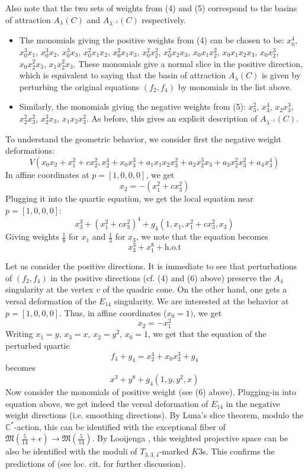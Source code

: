 \documentclass[11pt]{amsart}
\numberwithin{equation}{section}
\theoremstyle{plain}
\theoremstyle{remark}
\theoremstyle{definition}
\newcommand{\bC}{\mathbb{C}}
\newcommand{\gM}{\mathfrak{M}}
\begin{document}
Also note that the two sets of weights from (4) and (5) correspond to the basins of attraction $A_\lambda(C)$ and $A_{\lambda^{-1}}(C)$ respectively. 

 \begin{itemize}
 \item[(6)] The monomials giving the positive weights from (4) can be chosen to be: $x_0^4$, $x_0^3x_1$, $x_0^3x_2$, $x_0^3x_3$, $x_0^2x_1x_2$, $x_0^2x_1x_3$, $x_0^2x_2^2$, $x_0^2x_2x_3$, $x_0x_1x_2^2$, $x_0x_1x_2x_3$, $x_0x_2^3$, $x_0x_2^2x_3$, $x_1x_2^2x_3$. These monomials give a normal slice in the positive direction, which is equivalent to saying that the basin of attraction $A_{\lambda}(C)$ is 
 given by perturbing the original equations $(f_2,f_4)$ by monomials in the list above. 
  \item[(7)] Similarly, the monomials giving the negative weights from (5): $x_3^2$, $x_3^4$, $x_2x_3^3$,  $x_2^2 x_3^2$, $x_2^3x_3$, $x_1x_2x_3^2$. 
  As before, this gives an explicit description of $A_{\lambda^{-1}}(C)$.
 \end{itemize}

To understand the geometric behavior, we consider first the negative weight deformations:
$$V(x_0x_2+x_1^2+cx_2^2, x_2^4+x_0x_3^3+a_1 x_1x_2x_3^2+a_2x_2^3x_3+a_3x_2^2 x_3^2+a_4x_3^4)$$
In affine coordinates at $p=[1,0,0,0]$, we get
$$x_2=-(x_1^2+c x_3^2)$$
Plugging it into the quartic equation, we get the local equation near $p=[1,0,0,0]$:
$$x_3^3+(x_1^2+cx_3^2)^4+g_4(1,x_1,x_1^2+cx_3^2,x_3)$$
Giving weights $\frac{1}{8}$ for $x_1$ and $\frac{1}{3}$ for $x_3$, we note that the equation becomes
$$x_3^3+x_1^8+\textrm{h.o.t}$$
 
Let us consider the positive directions. It is immediate to see that perturbations of $(f_2,f_4)$ in the positive directions (cf. (4) and (6) above) preserve the $A_4$ singularity at the vertex $v$ of the quadric cone. On the other hand, one gets a versal deformation of the $E_{14}$ singularity. 
We are interested at the behavior at $p=[1,0,0,0]$. Thus, in affine coordinates ($x_0=1)$, we get 
 $$x_2=-x_1^2$$
Writing $x_1=y$, $x_3=x$, $x_2=y^2$, $x_0=1$, we get that the equation of the perturbed quartic 
$$f_4+g_4=x_2^4+x_0x_3^3+g_4$$
becomes
$$x^3+y^8+g_4(1,y,y^2,x)$$ 
Now consider the monomials of positive weight (see (6) above). Plugging-in into equation above, we get indeed the versal deformation of $E_{14}$ in the negative weight directions (i.e. smoothing directions).  By Luna's slice theorem, modulo the $\bC^*$-action, this can be identified with the exceptional fiber of $\gM(\frac{5}{14}+\epsilon)\to \gM(\frac{5}{14})$. By Looijenga \cite{ltriangle2}, this weighted projective space can be also be identified with the moduli of $T_{3,3,4}$-marked $K3$s. This confirms the predictions of \cite[Sect. 6]{log2} (see loc. cit. for further discussion). 
 
\end{document}
